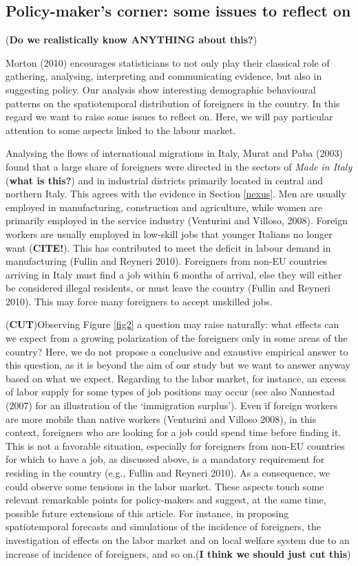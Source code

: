 \documentclass[10pt]{article}
\theoremstyle{definition}
\theoremstyle{plain}
\begin{document}
\subsection{Policy-maker's corner: some issues to reflect on  \label{PM}}

(\textbf{Do we realistically know ANYTHING about this?})

Morton (2010) encourages statisticians to not only play their classical role of gathering, analysing, interpreting and communicating evidence, but also in suggesting policy. Our analysis show interesting demographic behavioural patterns on the spatiotemporal distribution of foreigners in the country. In this regard we want to raise some issues to reflect on. Here, we will pay particular attention to some aspects linked to the labour market.

Analysing the flows of international migrations in Italy, Murat and Paba (2003) found that a large share of foreigners were directed in the sectors of \textsl{Made in Italy} (\textbf{what is this?}) and in industrial districts primarily located in central and northern Italy. This agrees with the evidence in Section \ref{nexus}. Men are usually employed in manufacturing, construction and agriculture, while women are primarily employed in the service industry (Venturini and Villoso, 2008). Foreign workers are usually employed in low-skill jobs that younger Italians no longer want (\textbf{CITE!}). This has contributed to meet the deficit in labour demand in manufacturing (Fullin and Reyneri 2010). Foreigners from non-EU countries arriving in Italy must find a job within 6 months of arrival, else they will either be considered illegal residents, or must leave the country (Fullin and Reyneri 2010). This may force many foreigners to accept unskilled jobs.

(\textbf{CUT})Observing Figure \ref{fig2} a question may raise naturally: what effects can we expect from a growing polarization of the foreigners only in some areas of the country? Here, we do not propose a conclusive and exaustive empirical answer to this question, as it is beyond the aim of our study but we want to answer anyway based on what we expect. Regarding to the labor market, for instance, an excess of labor supply for some types of job positions may occur (see also Nannestad (2007) for an illustration of the `immigration surplus'). Even if foreign workers are more mobile than native workers (Venturini and Villoso 2008), in this context, foreigners who are looking for a job could spend time before finding it. This is not a favorable situation, especially for foreigners from non-EU countries for which to have a job, as discussed above, is a mandatory requirement for residing in the country (e.g., Fullin and Reyneri 2010). As a consequence, we could observe some tensions in the labor market. These aspects touch some relevant remarkable points for policy-makers and suggest, at the same time, possible future  extensions of this article. For instance, in proposing spatiotemporal forecasts and simulations of the incidence of foreigners, the investigation of effects on the labor market and on local welfare system due to an increase of incidence of foreigners, and so on.(\textbf{I think we should just cut this})
\end{document}
